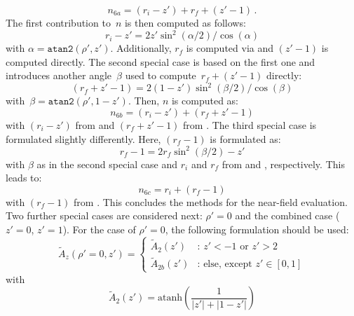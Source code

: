 \begin{equation}
  n_{6a} = (r_i - z') + r_f + (z'-1) \, .
\end{equation}
The first contribution to~$n$ is then computed as follows:
\begin{equation}
  r_i - z' = 2 z' \sin^2(\alpha/2) / \cos(\alpha) \label{eqn:ri_zp}
\end{equation}
with $\alpha = \texttt{atan2}(\rho', z')$.
Additionally, $r_f$ is computed via  and $(z'-1)$ is computed directly.
The second special case is based on the first one and introduces another angle~$\beta$
used to compute~$r_f + (z'-1)$ directly:
\begin{equation}
  (r_f + z' - 1) = 2 (1 - z') \sin^2(\beta/2) / \cos(\beta) \label{eqn:rf_zp_1}
\end{equation}
with~$\beta = \texttt{atan2}(\rho', 1-z')$.
Then, $n$ is computed as:
\begin{equation}
  n_{6b} = (r_i - z') + (r_f + z'-1)
\end{equation}
with $(r_i - z')$ from  and $(r_f + z' - 1)$ from .
The third special case is formulated slightly differently.
Here, $(r_f-1)$ is formulated as:
\begin{equation}
  r_f - 1 = 2 r_f \sin^2(\beta/2) - z' \label{eqn:rf_1}
\end{equation}
with $\beta$ as in the second special case
and $r_i$ and $r_f$ from  and , respectively.
This leads to:
\begin{equation}
  n_{6c} = r_i + (r_f - 1)
\end{equation}
with $(r_f - 1)$ from .
This concludes the methods for the near-field evaluation.
Two further special cases are considered next: $\rho' = 0$ and the combined case ($z'=0$, $z'=1$).
For the case of $\rho'=0$, the following formulation should be used:
\begin{equation}
  \tilde{A}_z (\rho'=0, z')
  = \begin{cases}
      \tilde{A}_2(z')  &:\, z' < -1 \textrm{ or } z' > 2 \\
      \tilde{A}_{2b}(z') &:\, \textrm{else, except } z' \in [0, 1]
    \end{cases}
\end{equation}
with
\begin{equation}
  \tilde{A}_2(z') = \textrm{atanh}\left( \frac{1}{|z'| + |1 - z'|} \right)
\end{equation}
